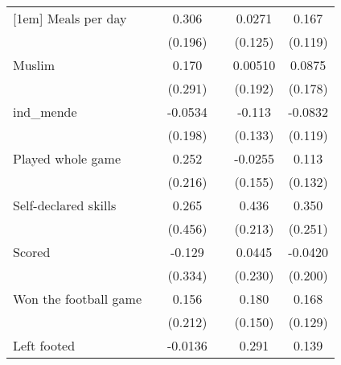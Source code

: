 {\begin{tabular}{l*{5}{c}}
[1em]
Meals per day       &                     &       0.306         &                     &      0.0271         &       0.167         \\
                    &                     &     (0.196)         &                     &     (0.125)         &     (0.119)         \\
[1em]
Muslim              &                     &       0.170         &                     &     0.00510         &      0.0875         \\
                    &                     &     (0.291)         &                     &     (0.192)         &     (0.178)         \\
[1em]
ind\_mende           &                     &     -0.0534         &                     &      -0.113         &     -0.0832         \\
                    &                     &     (0.198)         &                     &     (0.133)         &     (0.119)         \\
[1em]
Played whole game   &                     &       0.252         &                     &     -0.0255         &       0.113         \\
                    &                     &     (0.216)         &                     &     (0.155)         &     (0.132)         \\
[1em]
Self-declared skills&                     &       0.265         &                     &       0.436\sym{**} &       0.350         \\
                    &                     &     (0.456)         &                     &     (0.213)         &     (0.251)         \\
[1em]
Scored              &                     &      -0.129         &                     &      0.0445         &     -0.0420         \\
                    &                     &     (0.334)         &                     &     (0.230)         &     (0.200)         \\
[1em]
Won the football game&                     &       0.156         &                     &       0.180         &       0.168         \\
                    &                     &     (0.212)         &                     &     (0.150)         &     (0.129)         \\
[1em]
Left footed         &                     &     -0.0136         &                     &       0.291         &       0.139         \\

\end{tabular}}
